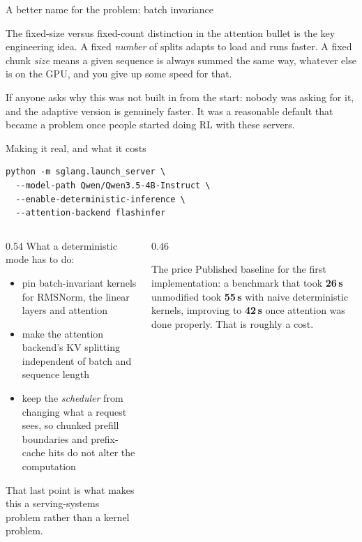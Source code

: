 \documentclass[aspectratio=169,10pt]{beamer}
\begin{document}
\begin{frame}[shrink=19]{A better name for the problem: batch invariance}
{  The fixed-size versus fixed-count distinction in the attention bullet is the
  key engineering idea. A fixed \emph{number} of splits adapts to load and runs
  faster. A fixed chunk \emph{size} means a given sequence is always summed the
  same way, whatever else is on the GPU, and you give up some speed for that.

  If anyone asks why this was not built in from the start: nobody was asking
  for it, and the adaptive version is genuinely faster. It was a reasonable
  default that became a problem once people started doing RL with these
  servers.}
\end{frame}

\begin{frame}[fragile,shrink=8]{Making it real, and what it costs}
\begin{lstlisting}[language=slurm]
python -m sglang.launch_server \
  --model-path Qwen/Qwen3.5-4B-Instruct \
  --enable-deterministic-inference \
  --attention-backend flashinfer
\end{lstlisting}
  \vspace{0.4em}
  \begin{columns}[T]
    \begin{column}{0.54\textwidth}
      \small
      What a deterministic mode has to do:
      \begin{itemize}
        \item pin batch-invariant kernels for RMSNorm, the linear layers and
          attention
        \item make the attention backend's KV splitting independent of batch
          and sequence length
        \item keep the \emph{scheduler} from changing what a request sees, so
          chunked prefill boundaries and prefix-cache hits do not alter the
          computation
      \end{itemize}
      \vspace{0.3em}
      That last point is what makes this a serving-systems problem rather than
      a kernel problem.
    \end{column}
    \begin{column}{0.46\textwidth}
      \begin{block}{The price}
        \small
        Published baseline for the first implementation: a benchmark that took
        \textbf{26\,s} unmodified took \textbf{55\,s} with naive deterministic
        kernels, improving to \textbf{42\,s} once attention was done properly.
        That is roughly a \key{$1.6\times$} cost.

\end{block}
\end{column}
\end{columns}
\end{frame}
\end{document}
